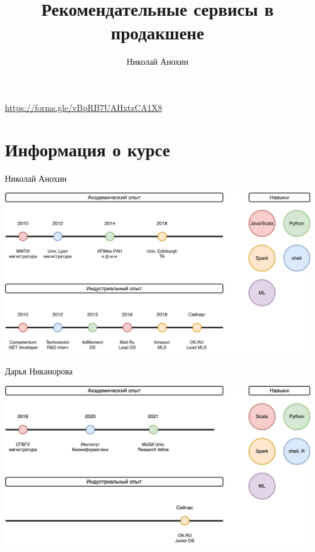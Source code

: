\documentclass[11pt,aspectratio=169,handout]{beamer}
\author{Николай Анохин}
\title{Рекомендательные сервисы в продакшене}
\begin{document}
{

\begin{frame}
\titlepage
\end{frame}


}

\begin{frame}{}

\begin{tcolorbox}[colback=info!5,colframe=info!80,title=Входной опрос]
\url{https://forms.gle/vBpRB7UAHxtzCA1X8}
\end{tcolorbox}

\end{frame}

\section{Информация о курсе}

\begin{frame}{Николай Анохин}

\begin{center}
\includegraphics[scale=0.23]{images/about-me.png}
\end{center}

\end{frame}

\begin{frame}{Дарья Никанорова}

\begin{center}
\includegraphics[scale=0.23]{images/about-me-dasha.jpg}
\end{center}

\end{frame}
\end{document}
